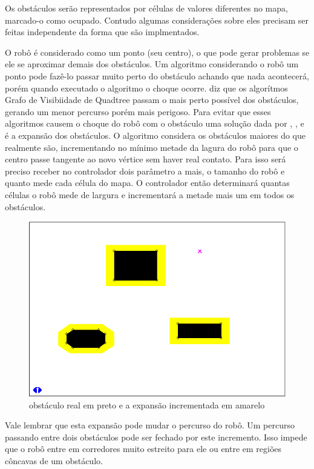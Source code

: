 Os obstáculos serão representados por células de valores diferentes no mapa, marcado-o como ocupado. Contudo algumas considerações sobre eles precisam ser feitas independente da forma que são implmentados.

O robô é considerado como um ponto (seu centro), o que pode gerar problemas se ele se aproximar demais dos obstáculos. Um algoritmo considerando o robô um ponto pode fazê-lo passar muito perto do obstáculo achando que nada acontecerá, porém quando executado o algoritmo o choque ocorre. \cite{Guzman2008} diz que os algorítmos Grafo de Visibiidade de Quadtree passam o mais perto possível dos obstáculos, gerando um menor percurso porém mais perigoso. Para evitar que esses algoritmos causem o choque do robô com o obstáculo uma solução dada por \cite{Souza2008}, \cite{Guzman2008}, \cite{Siegwart2004} e \cite{Thomsen2010} é a expansão dos obstáculos. O algoritmo considera os obstáculos maiores do que realmente são, incrementando no mínimo metade da lagura do robô para que o centro passe tangente ao novo vértice sem haver real contato. Para isso será preciso receber no controlador dois parâmetro a mais, o tamanho do robô e quanto mede cada célula do mapa. O controlador então determinará quantas células o robô mede de largura e incrementará a metade mais um em todos os obstáculos.

\begin{figure}[h]
	\centering
	\label{fig28}
		\includegraphics[keepaspectratio=true,scale=0.5]{figuras/expansao.png}
	\caption{obstáculo real em preto e a expansão incrementada em amarelo \cite{MRIT_SITE}}
\end{figure}

Vale lembrar que esta expansão pode mudar o percurso do robô. Um percurso passando entre dois obstáculos pode ser fechado por este incremento. Isso impede que o robô entre em corredores muito estreito para ele ou entre em regiões côncavas de um obstáculo.

